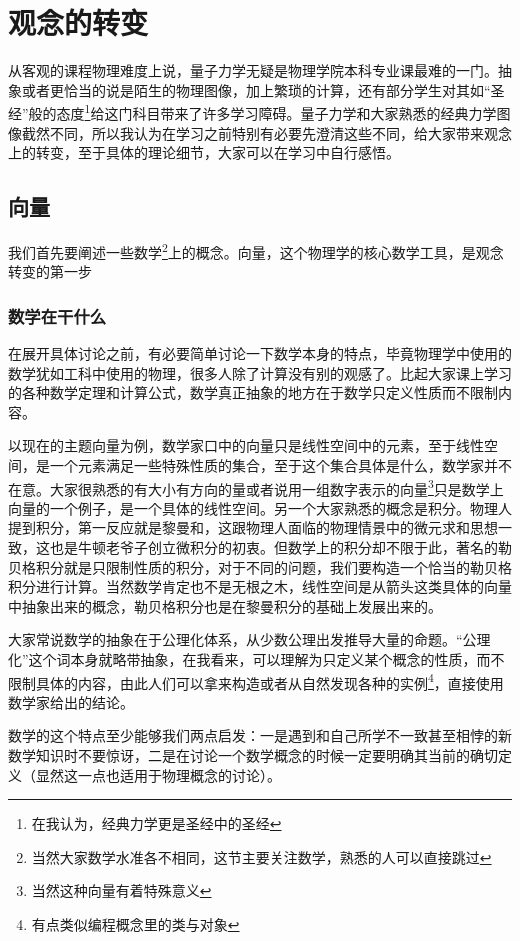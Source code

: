 \documentclass[../../main.tex]{subfiles}
\begin{document}
\chapter{观念的转变}

从客观的课程物理难度上说，量子力学无疑是物理学院本科专业课最难的一门。抽象或者更恰当的说是陌生的物理图像，加上繁琐的计算，还有部分学生对其如“圣经”般的态度\footnote{在我认为，经典力学更是圣经中的圣经}给这门科目带来了许多学习障碍。量子力学和大家熟悉的经典力学图像截然不同，所以我认为在学习之前特别有必要先澄清这些不同，给大家带来观念上的转变，至于具体的理论细节，大家可以在学习中自行感悟。
\section{向量}
我们首先要阐述一些数学\footnote{当然大家数学水准各不相同，这节主要关注数学，熟悉的人可以直接跳过}上的概念。向量，这个物理学的核心数学工具，是观念转变的第一步

\subsection{数学在干什么}
在展开具体讨论之前，有必要简单讨论一下数学本身的特点，毕竟物理学中使用的数学犹如工科中使用的物理，很多人除了计算没有别的观感了。比起大家课上学习的各种数学定理和计算公式，数学真正抽象的地方在于数学只定义性质而不限制内容。

以现在的主题向量为例，数学家口中的向量只是线性空间中的元素，至于线性空间，是一个元素满足一些特殊性质的集合，至于这个集合具体是什么，数学家并不在意。大家很熟悉的有大小有方向的量或者说用一组数字表示的向量\footnote{当然这种向量有着特殊意义}只是数学上向量的一个例子，是一个具体的线性空间。另一个大家熟悉的概念是积分。物理人提到积分，第一反应就是黎曼和，这跟物理人面临的物理情景中的微元求和思想一致，这也是牛顿老爷子创立微积分的初衷。但数学上的积分却不限于此，著名的勒贝格积分就是只限制性质的积分，对于不同的问题，我们要构造一个恰当的勒贝格积分进行计算。当然数学肯定也不是无根之木，线性空间是从箭头这类具体的向量中抽象出来的概念，勒贝格积分也是在黎曼积分的基础上发展出来的。

大家常说数学的抽象在于公理化体系，从少数公理出发推导大量的命题。“公理化”这个词本身就略带抽象，在我看来，可以理解为只定义某个概念的性质，而不限制具体的内容，由此人们可以拿来构造或者从自然发现各种的实例\footnote{有点类似编程概念里的类与对象}，直接使用数学家给出的结论。

数学的这个特点至少能够我们两点启发：一是遇到和自己所学不一致甚至相悖的新数学知识时不要惊讶，二是在讨论一个数学概念的时候一定要明确其当前的确切定义（显然这一点也适用于物理概念的讨论）。
\end{document}
